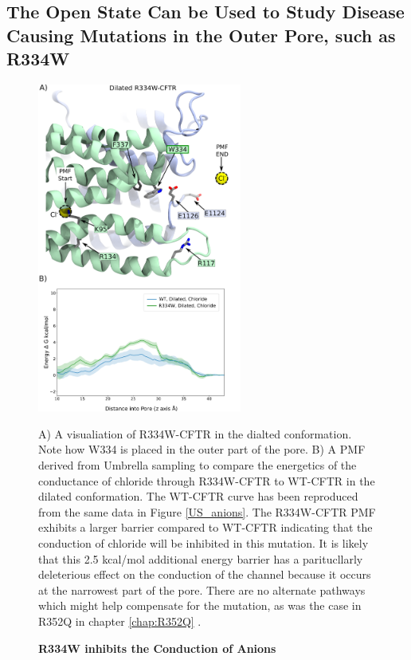 \subsection{The Open State Can be Used to Study Disease Causing Mutations in the Outer Pore, such as R334W}


\begin{figure}
	\label{R334_pmf}
	\begin{center}
		\includegraphics[width=0.6\textwidth]{figures/opening/R334W_pmf_combined.pdf}
	\end{center}
	\captionsetup{singlelinecheck = false, justification=raggedright}
	\caption[R334W Inhibits the Conduction of Anions] {\textbf{R334W inhibits the Conduction of Anions}}{A) A visualiation of R334W-CFTR in the dialted  conformation. Note how W334 is placed in the outer part of the pore. B) A PMF derived from Umbrella sampling to compare the energetics of the conductance of chloride through R334W-CFTR to WT-CFTR in the dilated conformation. The WT-CFTR curve has been reproduced from the same data in Figure \ref{US_anions}. The R334W-CFTR PMF exhibits a larger barrier compared to WT-CFTR indicating that the conduction of chloride will be inhibited in this mutation. It is likely that this 2.5 kcal/mol additional energy barrier has a paritucllarly deleterious effect on the conduction of the channel because it occurs at the narrowest part of the pore. There are no alternate pathways which might help compensate for the mutation, as was the case in R352Q in chapter \ref{chap:R352Q} \cite{wong2022a}.  }
\end{figure}

